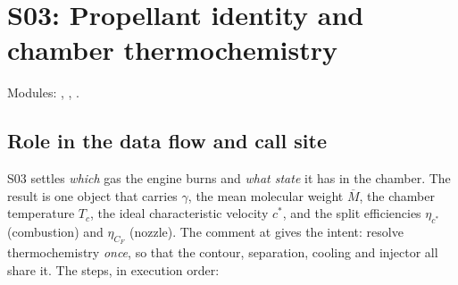 \section{S03: Propellant identity and chamber thermochemistry}\label{sec:s03}

 \quad Modules: , , .

\subsection{Role in the data flow and call site}

S03 settles \emph{which} gas the engine burns and \emph{what state} it has in the chamber. The result is one  object that carries $\gamma$, the mean molecular weight $\overline{M}$, the chamber temperature $T_c$, the ideal characteristic velocity $c^*$, and the split efficiencies $\eta_{c^*}$ (combustion) and $\eta_{C_F}$ (nozzle). The comment at  gives the intent: resolve thermochemistry \emph{once}, so that the contour, separation, cooling and injector all share it. The steps, in execution order:

